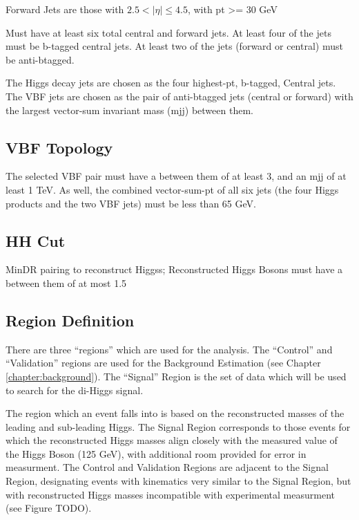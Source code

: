         Forward Jets are those with $ 2.5 < |\eta| \leq 4.5 $,
            with pt >= 30 GeV %

        Must have at least six total central and forward jets.
        At least four of the jets must be b-tagged central jets.
        At least two of the jets (forward or central) must be anti-btagged.

        The Higgs decay jets are chosen as the four highest-pt, b-tagged, Central jets.
        The VBF jets are chosen as the pair of anti-btagged jets (central or forward)
            with the largest vector-sum invariant mass (mjj) between them. %


    \subsection{VBF Topology}
        
        The selected VBF pair must have a \deta between them of at least 3, %
            and an mjj of at least 1 TeV. %
        As well, the combined vector-sum-pt of all six jets
            (the four Higgs products and the two VBF jets)
            must be less than 65 GeV. %


    \subsection{HH \deta Cut}

        MinDR pairing to reconstruct Higgss; %
        Reconstructed Higgs Bosons must have a \deta between them of at most 1.5 %


    \subsection{Region Definition}
        
        There are three ``regions'' which are used for the analysis.
        The ``Control'' and ``Validation'' regions are used for the Background Estimation (see Chapter \ref{chapter:background}).
        The ``Signal'' Region is the set of data which will be used to search for the di-Higgs signal.

        The region which an event falls into is based on the reconstructed masses of the leading and sub-leading Higgs.
        The Signal Region corresponds to those events for which the reconstructed Higgs masses
            align closely with the measured value of the Higgs Boson (125 GeV), with additional room provided for error in measurment.
        The Control and Validation Regions are adjacent to the Signal Region,
            designating events with kinematics very similar to the Signal Region,
            but with reconstructed Higgs masses incompatible with experimental measurment (see Figure TODO).



